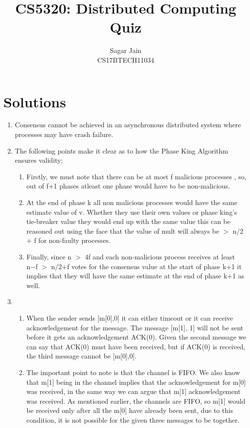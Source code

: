 \documentclass[12pt]{article}
\begin{document}
\title{CS5320: Distributed Computing\\Quiz}
\author{Sagar Jain\\CS17BTECH11034}
\maketitle
\section{Solutions}
\begin{enumerate}
\item Consensus cannot be achieved in an asynchronous distributed system where processes may have crash failure.
\item The following points make it clear as to how the Phase King Algorithm ensures validity:
\begin{enumerate}
\item Firstly, we must note that there can be at most f malicious processes , so, out of f+1 phases atleast one phase would have to be non-malicious.
\item At the end of phase k all non malicious processes would have the same estimate value of v. Whether they use their own values or phase king’s tie-breaker value they would end up with the same value this can be reasoned out using the face that the value of mult will always be $>$ n/2 + f for non-faulty processes.
\item Finally, since n $>$ 4f and each non-malicious process receives at least n−f $>$ n/2+f votes for the consensus value at the start of phase k+1 it implies that they will have the same estimate at the end of phase k+1 as well.
\end{enumerate} 
\item \begin{enumerate}
\item When the sender sends [m[0],0] it can either timeout or it can receive acknowledgement for the message. The message [m[1], 1] will not be sent before it gets an acknowledgement ACK(0). Given the second message we can say that ACK(0) must have been received, but if ACK(0) is received, the third message cannot be [m[0],0].
\item The important point to note is that the channel is FIFO. We also know that m[1] being in the channel implies that the acknowledgement for m[0] was received, in the same way we can argue that m[1] acknowledgement was received. As mentioned earlier, the channels are FIFO, so m[1] would be received only after all the m[0] have already been sent, due to this condition, it is not possible for the given three messages to be together.

\end{enumerate}
\end{enumerate}
\end{document}
